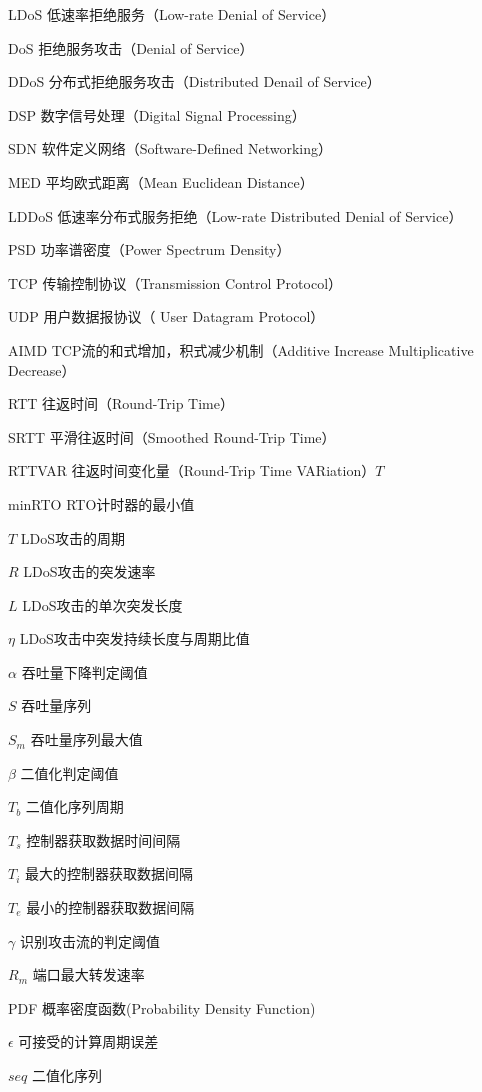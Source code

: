 \begin{denotation}[3cm]
    \item[LDoS] 低速率拒绝服务（Low-rate Denial of Service）
    \item[DoS] 拒绝服务攻击（Denial of Service）
    \item[DDoS] 分布式拒绝服务攻击（Distributed Denail of Service）
    \item[DSP] 数字信号处理（Digital Signal Processing）
    \item[SDN] 软件定义网络（Software-Defined Networking）
    \item[MED] 平均欧式距离（Mean Euclidean Distance）
    \item[LDDoS] 低速率分布式服务拒绝（Low-rate Distributed Denial of Service）
    \item[PSD] 功率谱密度（Power Spectrum Density）
    \item[TCP] 传输控制协议（Transmission Control Protocol）
    \item[UDP] 用户数据报协议（ User Datagram Protocol）
    \item[AIMD] TCP流的和式增加，积式减少机制（Additive Increase Multiplicative Decrease）
    \item[RTT]	往返时间（Round-Trip Time）
    \item[SRTT] 平滑往返时间（Smoothed Round-Trip Time）
    \item[RTTVAR] 往返时间变化量（Round-Trip Time VARiation）$T$
    \item[minRTO] RTO计时器的最小值
    \item[$T$] LDoS攻击的周期
    \item[$R$] LDoS攻击的突发速率
    \item[$L$] LDoS攻击的单次突发长度
    \item[$\eta$] LDoS攻击中突发持续长度与周期比值
    \item[$\alpha$] 吞吐量下降判定阈值
    \item[$S$] 吞吐量序列
    \item[$S_m$] 吞吐量序列最大值
    \item[$\beta$] 二值化判定阈值
    \item[$T_b$] 二值化序列周期
    \item[$T_s$] 控制器获取数据时间间隔
    \item[$T_i$] 最大的控制器获取数据间隔
    \item[$T_e$] 最小的控制器获取数据间隔
    \item[$\gamma$] 识别攻击流的判定阈值
    \item[$R_m$] 端口最大转发速率
    \item[PDF] 概率密度函数(Probability Density Function)
    \item[$\epsilon$] 可接受的计算周期误差
    \item[$seq$] 二值化序列

\end{denotation}




